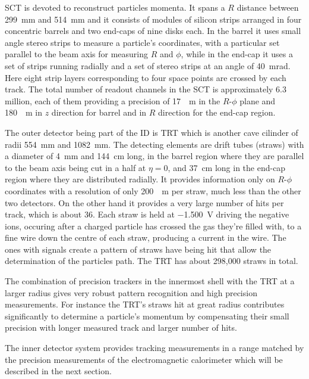 SCT is devoted to reconstruct particles momenta. It spans a $R$ distance between \SI{299}{mm} and \SI{514}{mm} and it consists of modules of silicon strips arranged in four concentric barrels and two end-caps of nine disks each. In the barrel it uses small angle stereo strips to measure a particle's coordinates, with a particular set parallel to the beam axis for measuring $R$ and $\phi$, while in the end-cap it uses a set of strips running radially and a set of stereo strips at an angle of \SI{40}{mrad}. Here eight strip layers corresponding to four space points are crossed by each track. The total number of readout channels in the SCT is approximately 6.3 million, each of them providing a precision of \SI{17}{\mu m} in the $R$-$\phi$ plane and \SI{180}{\mu m} in $z$ direction for barrel and in $R$ direction for the end-cap region.

The outer detector being part of the ID is TRT which is another cave cilinder of radii \SI{554}{mm} and \SI{1082}{mm}. The detecting elements are drift tubes (straws) with a diameter of \SI{4}{mm} and \SI{144}{cm} long, in the barrel region where they are parallel to the beam axis being cut in a half at $\eta =0$, and \SI{37}{cm} long in the end-cap region where they are distributed radially. It provides information only on $R$-$\phi$ coordinates with a resolution of  only \SI{200}{\mu m} per straw, much less than the other two detectors. On the other hand it provides a very large number of hits per track, which is about \num{36}. Each straw is held at \SI{-1.500}{V} driving the negative ions, occuring after a charged particle has crossed the gas they're filled with, to a fine wire down the centre of each straw, producing a current in the wire. The ones with signals create a pattern of straws have being hit that allow the determination of the particles path. The TRT has about 298,000 straws in total.

The combination of precision trackers in the innermost shell with the TRT at a larger radius gives very robust pattern recognition and high precision measurements. For instance the TRT's straws hit at great radius contributes significantly to determine a particle's momentum by compensating their small precision with longer measured track and larger number of hits.

The inner detector system provides tracking measurements in a range matched by the precision measurements of the electromagnetic calorimeter which will be described in the next section.

